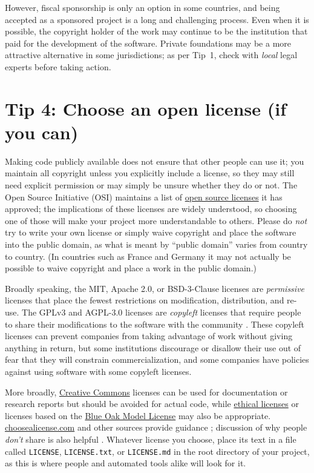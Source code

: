 \documentclass[10pt,letterpaper]{article}
\begin{document}
However,
fiscal sponsorship is only an option in some countries,
and being accepted as a sponsored project is a long and challenging process.
Even when it is possible,
the copyright holder of the work may continue to be the institution that paid for the development of the software.
Private foundations may be a more attractive alternative in some jurisdictions;
as per Tip~1,
check with \emph{local} legal experts before taking action.

\section*{Tip 4: Choose an open license (if you can)}

Making code publicly available does not ensure that other people can use it;
you maintain all copyright unless you explicitly include a license,
so they may still need explicit permission
or may simply be unsure whether they do or not.
The Open Source Initiative (OSI)
maintains a list of \href{https://opensource.org/licenses}{open source licenses} it has approved;
the implications of these licenses are widely understood,
so choosing one of those will make your project more understandable to others.
Please do \emph{not} try to write your own license
or simply waive copyright and place the software into the public domain,
as what is meant by ``public domain'' varies from country to country.
(In countries such as France and Germany
it may not actually be possible to waive copyright and place a work in the public domain.)

Broadly speaking,
the MIT, Apache 2.0, or BSD-3-Clause licenses are \emph{permissive} licenses
that place the fewest restrictions on modification, distribution, and re-use.
The GPLv3 and AGPL-3.0 licenses are \emph{copyleft} licenses
that require people to share their modifications to the software with the community \cite{Morin2012}.
These copyleft licenses can prevent companies from taking advantage of work without giving anything in return,
but some institutions discourage or disallow their use out of fear that they will constrain commercialization,
and some companies have policies against using software with some copyleft licenses.

More broadly,
\href{https://creativecommons.org/}{Creative Commons} licenses can be used for documentation or research reports
but should be avoided for actual code,
while \href{https://ethicalsource.dev/}{ethical licenses}
or licenses based on the \href{https://blueoakcouncil.org/license/1.0.0}{Blue Oak Model License} may also be appropriate.
\href{http://choosealicense.com}{choosealicense.com} and other sources provide guidance \cite{Fogel2020,Fortunato2021};
discussion of why people \emph{don't} share is also helpful \cite{Gomes2022}.
Whatever license you choose,
place its text in a file called \texttt{LICENSE}, \texttt{LICENSE.txt}, or \texttt{LICENSE.md}
in the root directory of your project,
as this is where people and automated tools alike will look for it.
\end{document}
